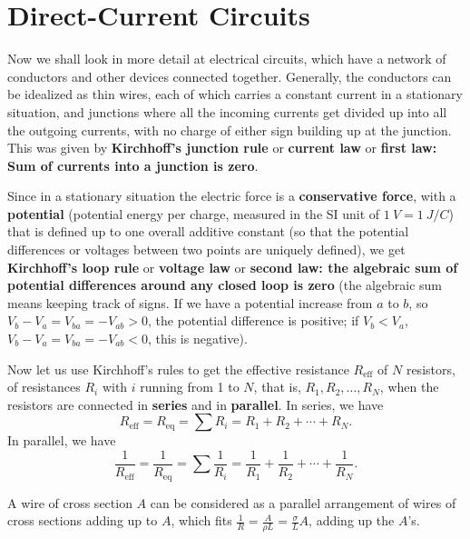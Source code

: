 \chapter{Direct-Current Circuits}

Now we shall look in more detail at electrical circuits, which have a network of conductors and other devices connected together. Generally, the conductors can be idealized as thin wires, each of which carries a constant current in a stationary situation, and junctions where all the incoming currents get divided up into all the outgoing currents, with no charge of either sign building up at the junction. This was given by \textbf{Kirchhoff's junction rule} or \textbf{current law} or \textbf{first law: Sum of currents into a junction is zero}.

Since in a stationary situation the electric force is a \textbf{conservative force}, with a \textbf{potential} (potential energy per charge, measured in the SI unit of $\SI{1}{V} = \SI{1}{J/C}$) that is defined up to one overall additive constant (so that the potential differences or voltages between two points are uniquely defined), we get \textbf{Kirchhoff's loop rule} or \textbf{voltage law} or \textbf{second law: the algebraic sum of potential differences around any closed loop is zero} (the algebraic sum means keeping track of signs. If we have a potential increase from $a$ to $b$, so $V_b - V_a = V_{ba} = -V_{ab} > 0$, the potential difference is positive; if $V_b < V_a$, $V_b - V_a = V_{ba} = -V_{ab} < 0$, this is negative).

Now let us use Kirchhoff's rules to get the effective resistance $R_\text{eff}$ of $N$ resistors, of resistances $R_i$ with $i$ running from 1 to $N$, that is, $R_1, R_2, \ldots, R_N$, when the resistors are connected in \textbf{series} and in \textbf{parallel}. In series, we have 
\begin{equation}
R_\text{eff} = R_\text{eq} = \sum R_i = R_1 + R_2 + \cdots + R_N.
\end{equation}
In parallel, we have
\begin{equation}
\dfrac{1}{R_\text{eff}} = \dfrac{1}{R_\text{eq}} = \sum \dfrac{1}{R_i} = \dfrac{1}{R_1} + \dfrac{1}{R_2} + \cdots + \dfrac{1}{R_N}.
\end{equation}

A wire of cross section $A$ can be considered as a parallel arrangement of wires of cross sections adding up to $A$, which fits $\frac{1}{R} = \frac{A}{\rho L} = \frac{\sigma}{L}A$, adding up the $A$'s.

